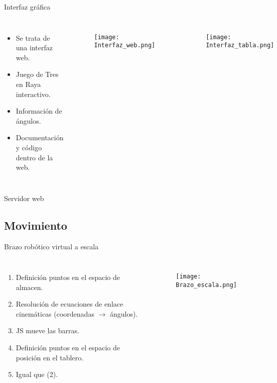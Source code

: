 \documentclass[xcolor = {dvipsnames, table}]{beamer}
\begin{document}
\begin{frame}{Interfaz gráfica}
  \begin{columns}
    \begin{itemize}
      \item Se trata de una interfaz web.
      \item Juego de Tres en Raya interactivo.
      \item Información de ángulos.
      \item Documentación y código dentro de la web.
    \end{itemize}
    \begin{figure}
      \centering
      \texttt{[image: Interfaz\_web.png]}
    \end{figure}
    \begin{figure}
      \centering
      \texttt{[image: Interfaz\_tabla.png]}
    \end{figure}
  \end{columns}
\end{frame}

\begin{frame}{Servidor web}
  \begin{figure}
    \centering
    \scalebox{.65}{}
  \end{figure}
\end{frame}


\subsection{Movimiento}

\begin{frame}{Brazo robótico virtual a escala}
  \begin{columns}
    \begin{enumerate}
      \item Definición puntos en el espacio de almacen.
      \item Resolución de ecuaciones de enlace cinemáticas (coordenadas $\rightarrow$
      ángulos).
      \item JS mueve las barras.
      \item Definición puntos en el espacio de posición en el tablero.
      \item Igual que (2).
    \end{enumerate}
    \begin{figure}
      \centering
      \texttt{[image: Brazo\_escala.png]}
    \end{figure}
  \end{columns}
\end{frame}
\end{document}
